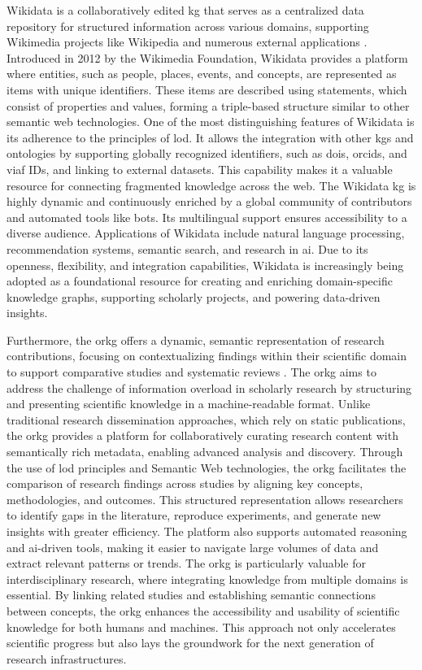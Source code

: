 Wikidata is a collaboratively edited \gls{kg} that serves as a centralized data repository for structured information across various domains, supporting Wikimedia projects like Wikipedia and numerous external applications \cite{Wikidata2014}.
Introduced in 2012 by the Wikimedia Foundation, Wikidata provides a platform where entities, such as people, places, events, and concepts, are represented as items with unique identifiers.
These items are described using statements, which consist of properties and values, forming a triple-based structure similar to other semantic web technologies.
One of the most distinguishing features of Wikidata is its adherence to the principles of \gls{lod}.
It allows the integration with other \glspl{kg} and ontologies by supporting globally recognized identifiers, such as \glspl{doi}, \glspl{orcid}, and \gls{viaf} IDs, and linking to external datasets.
This capability makes it a valuable resource for connecting fragmented knowledge across the web.
The Wikidata \gls{kg} is highly dynamic and continuously enriched by a global community of contributors and automated tools like bots.
Its multilingual support ensures accessibility to a diverse audience.
Applications of Wikidata include natural language processing, recommendation systems, semantic search, and research in \gls{ai}.
Due to its openness, flexibility, and integration capabilities, Wikidata is increasingly being adopted as a foundational resource for creating and enriching domain-specific knowledge graphs, supporting scholarly projects, and powering data-driven insights.

Furthermore, the \gls{orkg} offers a dynamic, semantic representation of research contributions, focusing on contextualizing findings within their scientific domain to support comparative studies and systematic reviews \cite{ORKG}.
The \gls{orkg} aims to address the challenge of information overload in scholarly research by structuring and presenting scientific knowledge in a machine-readable format.
Unlike traditional research dissemination approaches, which rely on static publications, the \gls{orkg} provides a platform for collaboratively curating research content with semantically rich metadata, enabling advanced analysis and discovery.
Through the use of \gls{lod} principles and Semantic Web technologies, the \gls{orkg} facilitates the comparison of research findings across studies by aligning key concepts, methodologies, and outcomes.
This structured representation allows researchers to identify gaps in the literature, reproduce experiments, and generate new insights with greater efficiency.
The platform also supports automated reasoning and \gls{ai}-driven tools, making it easier to navigate large volumes of data and extract relevant patterns or trends.
The \gls{orkg} is particularly valuable for interdisciplinary research, where integrating knowledge from multiple domains is essential.
By linking related studies and establishing semantic connections between concepts, the \gls{orkg} enhances the accessibility and usability of scientific knowledge for both humans and machines.
This approach not only accelerates scientific progress but also lays the groundwork for the next generation of research infrastructures.

